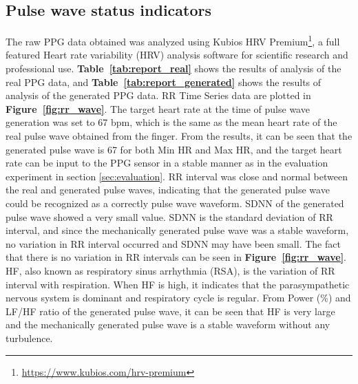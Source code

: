 \documentclass[sigchi,authordraft]{acmart}
\newcommand\figref[1]{\textbf{Figure~\ref{fig:#1}}}
\newcommand\tabref[1]{\textbf{Table~\ref{tab:#1}}}
\begin{document}
\subsection{Pulse wave status indicators}
The raw PPG data obtained was analyzed using Kubios HRV Premium\footnote{\url{https://www.kubios.com/hrv-premium}}, a full featured Heart rate variability (HRV) analysis software for scientific research and professional use. \tabref{report_real} shows the results of analysis of the real PPG data, and \tabref{report_generated} shows the results of analysis of the generated PPG data. RR Time Series data are plotted in \figref{rr_wave}. The target heart rate at the time of pulse wave generation was set to 67 bpm, which is the same as the mean heart rate of the real pulse wave obtained from the finger. From the results, it can be seen that the generated pulse wave is 67 for both Min HR and Max HR, and the target heart rate can be input to the PPG sensor in a stable manner as in the evaluation experiment in section \ref{sec:evaluation}. RR interval was close and normal between the real and generated pulse waves, indicating that the generated pulse wave could be recognized as a correctly pulse wave waveform. SDNN of the generated pulse wave showed a very small value. SDNN is the standard deviation of RR interval, and since the mechanically generated pulse wave was a stable waveform, no variation in RR interval occurred and SDNN may have been small. The fact that there is no variation in RR intervals can be seen in \figref{rr_wave}. HF, also known as respiratory sinus arrhythmia (RSA), is the variation of RR interval with respiration. When HF is high, it indicates that the parasympathetic nervous system is dominant and respiratory cycle is regular. From Power (\%) and LF/HF ratio of the generated pulse wave, it can be seen that HF is very large and the mechanically generated pulse wave is a stable waveform without any turbulence.
\end{document}
